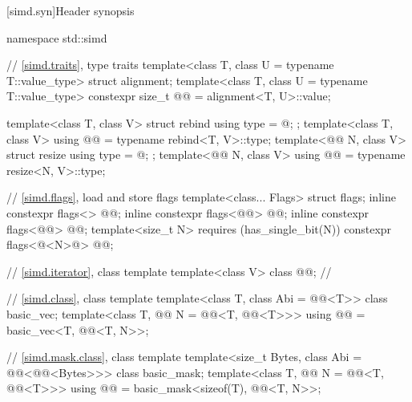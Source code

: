 [simd.syn]{Header  synopsis}
%
\begin{codeblock}
namespace std::simd {
  // \ref{simd.traits}, type traits
  template<class T, class U = typename T::value_type> struct alignment;
  template<class T, class U = typename T::value_type>
    constexpr size_t @@ = alignment<T, U>::value;

  template<class T, class V> struct rebind { using type = @\seebelow@; };
  template<class T, class V> using @@ = typename rebind<T, V>::type;
  template<@@ N, class V> struct resize { using type = @\seebelow@; };
  template<@@ N, class V> using @@ = typename resize<N, V>::type;

  // \ref{simd.flags}, load and store flags
  template<class... Flags> struct flags;
  inline constexpr flags<> @@{};
  inline constexpr flags<@@> @@{};
  inline constexpr flags<@@> @@{};
  template<size_t N> requires (has_single_bit(N))
    constexpr flags<@<N>@> @@{};

  // \ref{simd.iterator}, class template 
  template<class V>
    class @@;                // \expos

  // \ref{simd.class}, class template 
  template<class T, class Abi = @@<T>> class basic_vec;
  template<class T, @@ N = @@<T, @@<T>>>
    using @@ = basic_vec<T, @@<T, N>>;

  // \ref{simd.mask.class}, class template 
  template<size_t Bytes, class Abi = @@<@@<Bytes>>> class basic_mask;
  template<class T, @@ N = @@<T, @@<T>>>
    using @@ = basic_mask<sizeof(T), @@<T, N>>;

}
\end{codeblock}

